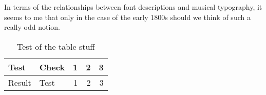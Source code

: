 \documentclass[10pt]{newlfm}
\begin{document}
\begin{newlfm}
  In terms of the relationships between font
  descriptions and musical typography, it seems to
  me that only in the case of the early 1800s
  should we think of such a really odd notion.

  \begin{table}[htbp]
    \begin{center}
      \begin{tabular}{|l|lrrr|} \hline
      Test & Check & 1 & 2 & 3 \\ 
      \hline
      Result & Test & 1 & 2 & 3 \\ \hline
      \end{tabular}
      \caption{Test of the table stuff}
      \label{tab:test}
    \end{center}
  \end{table}
\end{newlfm}
\end{document}
